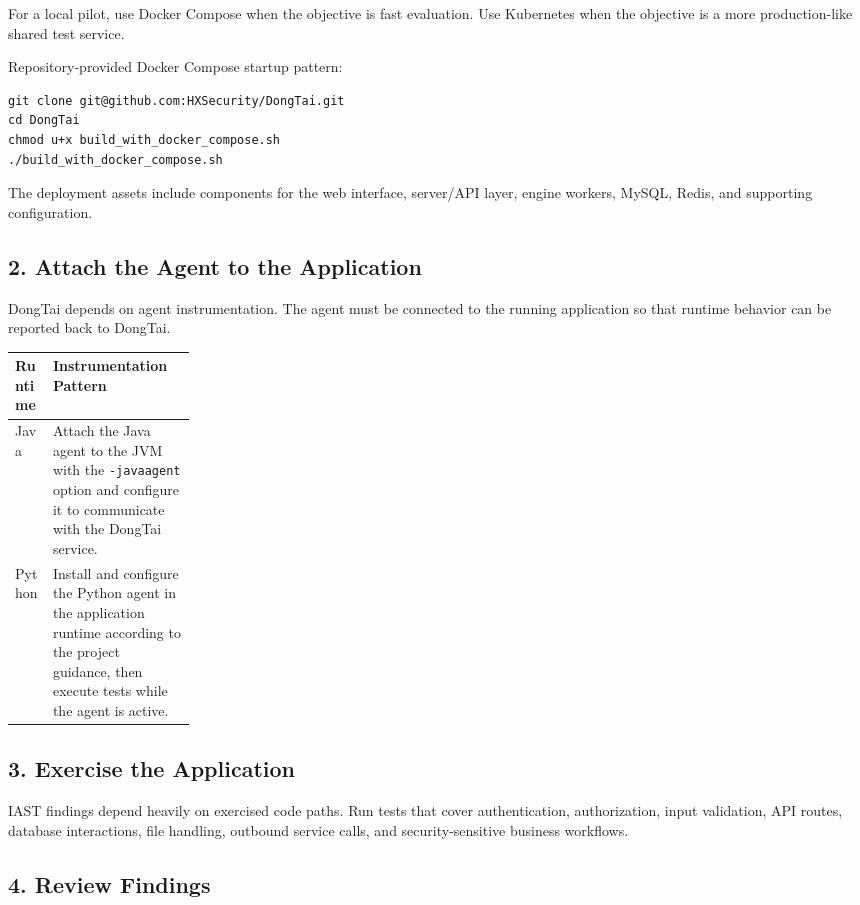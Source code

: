 \documentclass[11pt]{article}
\begin{document}
For a local pilot, use Docker Compose when the objective is fast evaluation. Use Kubernetes when the objective is a more production-like shared test service.

Repository-provided Docker Compose startup pattern:

\begin{verbatim}
git clone git@github.com:HXSecurity/DongTai.git
cd DongTai
chmod u+x build_with_docker_compose.sh
./build_with_docker_compose.sh
\end{verbatim}

The deployment assets include components for the web interface, server/API layer, engine workers, MySQL, Redis, and supporting configuration.

\subsection{2. Attach the Agent to the Application}

DongTai depends on agent instrumentation. The agent must be connected to the running application so that runtime behavior can be reported back to DongTai.

\begin{center}
\begin{tabularx}{\linewidth}{L{0.21\linewidth}Y}
\toprule
\textbf{Runtime} & \textbf{Instrumentation Pattern} \\
\midrule
Java & Attach the Java agent to the JVM with the \texttt{-javaagent} option and configure it to communicate with the DongTai service. \\
Python & Install and configure the Python agent in the application runtime according to the project guidance, then execute tests while the agent is active. \\
\bottomrule
\end{tabularx}
\end{center}

\subsection{3. Exercise the Application}

IAST findings depend heavily on exercised code paths. Run tests that cover authentication, authorization, input validation, API routes, database interactions, file handling, outbound service calls, and security-sensitive business workflows.

\subsection{4. Review Findings}
\end{document}
